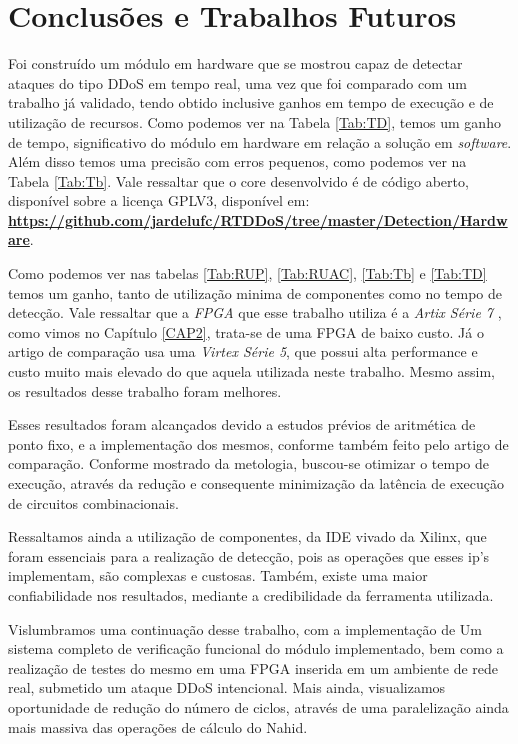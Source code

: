 \chapter[Conclusões e Trabalhos Futuros]{Conclusões e Trabalhos Futuros}
Foi construído um módulo em hardware que se mostrou capaz de detectar ataques do tipo DDoS em tempo real, uma vez que foi comparado com um trabalho já validado, tendo obtido inclusive ganhos em tempo de execução e de utilização de recursos. Como podemos ver na Tabela \ref{Tab:TD}, temos um ganho de tempo, significativo do módulo em hardware em relação a solução em \textit{software}. Além disso temos uma precisão com erros pequenos, como podemos ver na Tabela \ref{Tab:Tb}. Vale ressaltar que o core desenvolvido é de código aberto, disponível sobre a licença GPLV3, disponível em: \textbf{\url{https://github.com/jardelufc/RTDDoS/tree/master/Detection/Hardware}}.

Como podemos ver nas tabelas \ref{Tab:RUP}, \ref{Tab:RUAC}, \ref{Tab:Tb} e \ref{Tab:TD} temos um ganho, tanto de utilização minima de componentes como no tempo de detecção. Vale ressaltar que a \textit{FPGA} que esse trabalho utiliza é a \textit{Artix Série 7} , como vimos no Capítulo \ref{CAP2}, trata-se de uma FPGA de baixo custo. Já o artigo de comparação usa uma \textit{Virtex Série 5}, que possui alta performance e custo muito mais elevado do que aquela utilizada neste trabalho. Mesmo assim, os resultados desse trabalho foram melhores.

Esses resultados foram alcançados devido a estudos prévios de aritmética de ponto fixo,  e a implementação dos mesmos, conforme também feito pelo artigo de comparação. Conforme mostrado da metologia, buscou-se otimizar o tempo de execução, através da redução e consequente  minimização da latência de execução de circuitos combinacionais.

Ressaltamos ainda a utilização de componentes, da IDE vivado da Xilinx, que foram essenciais para a realização de detecção, pois as operações que esses ip's implementam, são complexas e custosas. Também, existe uma maior confiabilidade nos resultados, mediante a credibilidade da ferramenta utilizada.

Vislumbramos uma continuação desse trabalho, com a implementação de Um sistema completo de verificação funcional do módulo implementado, bem como a realização de testes do mesmo em uma FPGA inserida em um ambiente de rede real, submetido um ataque DDoS intencional. Mais ainda, visualizamos oportunidade de redução do número de ciclos, através de uma paralelização ainda mais massiva das operações de cálculo do Nahid. 


